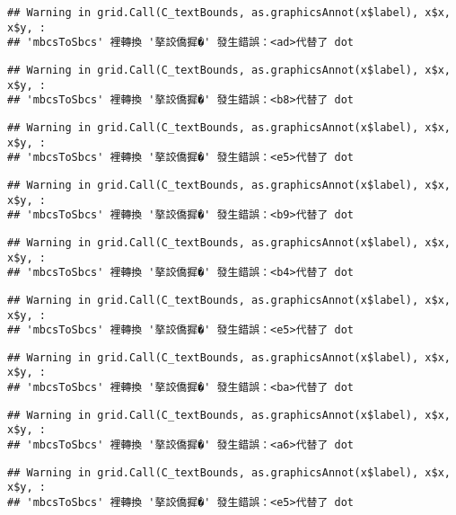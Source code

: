\documentclass[
]{article}
\begin{document}
\begin{verbatim}
## Warning in grid.Call(C_textBounds, as.graphicsAnnot(x$label), x$x, x$y, :
## 'mbcsToSbcs' 裡轉換 '摮詨僑摨�' 發生錯誤：<ad>代替了 dot
\end{verbatim}

\begin{verbatim}
## Warning in grid.Call(C_textBounds, as.graphicsAnnot(x$label), x$x, x$y, :
## 'mbcsToSbcs' 裡轉換 '摮詨僑摨�' 發生錯誤：<b8>代替了 dot
\end{verbatim}

\begin{verbatim}
## Warning in grid.Call(C_textBounds, as.graphicsAnnot(x$label), x$x, x$y, :
## 'mbcsToSbcs' 裡轉換 '摮詨僑摨�' 發生錯誤：<e5>代替了 dot
\end{verbatim}

\begin{verbatim}
## Warning in grid.Call(C_textBounds, as.graphicsAnnot(x$label), x$x, x$y, :
## 'mbcsToSbcs' 裡轉換 '摮詨僑摨�' 發生錯誤：<b9>代替了 dot
\end{verbatim}

\begin{verbatim}
## Warning in grid.Call(C_textBounds, as.graphicsAnnot(x$label), x$x, x$y, :
## 'mbcsToSbcs' 裡轉換 '摮詨僑摨�' 發生錯誤：<b4>代替了 dot
\end{verbatim}

\begin{verbatim}
## Warning in grid.Call(C_textBounds, as.graphicsAnnot(x$label), x$x, x$y, :
## 'mbcsToSbcs' 裡轉換 '摮詨僑摨�' 發生錯誤：<e5>代替了 dot
\end{verbatim}

\begin{verbatim}
## Warning in grid.Call(C_textBounds, as.graphicsAnnot(x$label), x$x, x$y, :
## 'mbcsToSbcs' 裡轉換 '摮詨僑摨�' 發生錯誤：<ba>代替了 dot
\end{verbatim}

\begin{verbatim}
## Warning in grid.Call(C_textBounds, as.graphicsAnnot(x$label), x$x, x$y, :
## 'mbcsToSbcs' 裡轉換 '摮詨僑摨�' 發生錯誤：<a6>代替了 dot
\end{verbatim}

\begin{verbatim}
## Warning in grid.Call(C_textBounds, as.graphicsAnnot(x$label), x$x, x$y, :
## 'mbcsToSbcs' 裡轉換 '摮詨僑摨�' 發生錯誤：<e5>代替了 dot
\end{verbatim}
\end{document}
